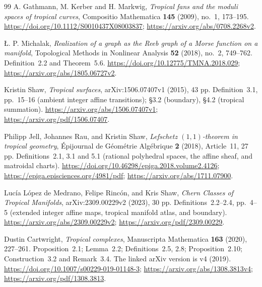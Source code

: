 \begin{thebibliography}{99}
A. Gathmann, M. Kerber and H. Markwig,
\emph{Tropical fans and the moduli spaces of tropical curves},
Compositio Mathematica \textbf{145} (2009), no.~1, 173--195.
\url{https://doi.org/10.1112/S0010437X08003837};
\url{https://arxiv.org/abs/0708.2268v2}.

\L{}. P. Michalak,
\emph{Realization of a graph as the Reeb graph of a Morse function on a manifold},
Topological Methods in Nonlinear Analysis \textbf{52} (2018), no.~2, 749--762.
Definition~2.2 and Theorem~5.6.
\url{https://doi.org/10.12775/TMNA.2018.029};
\url{https://arxiv.org/abs/1805.06727v2}.


Kristin Shaw,
\emph{Tropical surfaces},
arXiv:1506.07407v1 (2015), 43 pp.
Definition~3.1, pp.~15--16 (ambient integer affine transitions);
\S3.2 (boundary), \S4.2 (tropical summation).
\url{https://arxiv.org/abs/1506.07407v1};
\url{https://arxiv.org/pdf/1506.07407}.

Philipp Jell, Johannes Rau, and Kristin Shaw,
\emph{Lefschetz $(1,1)$-theorem in tropical geometry},
\'Epijournal de G\'eom\'etrie Alg\'ebrique \textbf{2} (2018), Article~11, 27 pp.
Definitions~2.1, 3.1 and 5.1 (rational polyhedral spaces, the affine sheaf, and matroidal charts).
\url{https://doi.org/10.46298/epiga.2018.volume2.4126};
\url{https://epiga.episciences.org/4981/pdf};
\url{https://arxiv.org/abs/1711.07900}.

Luc\'ia L\'opez de Medrano, Felipe Rinc\'on, and Kris Shaw,
\emph{Chern Classes of Tropical Manifolds},
arXiv:2309.00229v2 (2023), 30 pp.
Definitions~2.2--2.4, pp.~4--5 (extended integer affine maps, tropical manifold atlas, and boundary).
\url{https://arxiv.org/abs/2309.00229v2};
\url{https://arxiv.org/pdf/2309.00229}.

Dustin Cartwright,
\emph{Tropical complexes},
Manuscripta Mathematica \textbf{163} (2020), 227--261.
Proposition~2.1; Lemma~2.2; Definitions~2.5, 2.8;
Proposition~2.10; Construction~3.2 and Remark~3.4.
The linked arXiv version is v4 (2019).
\url{https://doi.org/10.1007/s00229-019-01148-3};
\url{https://arxiv.org/abs/1308.3813v4};
\url{https://arxiv.org/pdf/1308.3813}.



\end{thebibliography}
